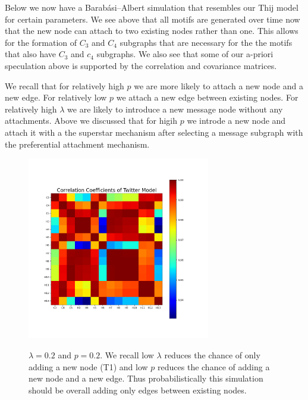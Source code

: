 Below we now have a Barabási–Albert simulation that resembles our Thij model for certain parameters. We 
see above that all motifs are generated over time now that the new node can attach to two existing nodes
rather than one. This allows for the formation of $C_3$ and $C_4$ subgraphs that are necessary for the
the motifs that also have $C_3$ and $c_4$ subgraphs. We also see that some of our a-priori speculation
above is supported by the correlation and covariance matrices. 


We recall that for relatively high $p$ we are more likely to attach a new node and a new
edge. For relatively low $p$ we attach a new edge between existing nodes. For relatively
high $\lambda$ we are likely to introduce a new message node without any attachments. 
Above we discussed that for higih $p$ we introde a new node and attach it with
a the superstar mechanism after selecting a message subgraph with the preferential
attachment mechanism.

\begin{figure}
    \includegraphics[width=8cm]{Images/CorrCoefTwitterModel020209.png}\
    \centering
    \caption{$\lambda=0.2$ and $p=0.2$. We recall low $\lambda$ reduces the chance of only adding a new node (T1)
    and low $p$ reduces the chance of adding a new node and a new edge. Thus 
    probabilistically this simulation should be overall adding only edges between existing nodes.}
\end{figure}

